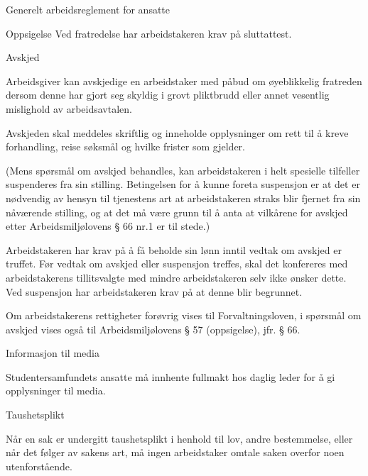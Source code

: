 \begin{lovkapittel}{Generelt arbeidsreglement for ansatte}
\begin{lovparagraf}{Oppsigelse}
        Ved fratredelse har arbeidstakeren krav på sluttattest.

    \end{lovparagraf}

    \begin{lovparagraf}{Avskjed}

        Arbeidsgiver kan avskjedige en arbeidstaker med påbud om øyeblikkelig fratreden dersom denne har gjort seg skyldig
        i grovt pliktbrudd eller annet vesentlig mislighold av arbeidsavtalen.

        Avskjeden skal meddeles skriftlig og inneholde opplysninger om rett til å kreve forhandling, reise søksmål og hvilke
        frister som gjelder.

        (Mens spørsmål om avskjed behandles, kan arbeidstakeren i helt spesielle tilfeller suspenderes fra sin stilling.
        Betingelsen for å kunne foreta suspensjon er at det er nødvendig av hensyn til tjenestens art at arbeidstakeren straks
        blir fjernet fra sin nåværende stilling, og at det må være grunn til å anta at vilkårene for avskjed etter
        Arbeidsmiljølovens § 66 nr.1 er til stede.)

        Arbeidstakeren har krav på å få beholde sin lønn inntil vedtak om avskjed er truffet.
        Før vedtak om avskjed eller suspensjon treffes, skal det konfereres med arbeidstakerens tillitsvalgte med mindre
        arbeidstakeren selv ikke ønsker dette. Ved suspensjon har arbeidstakeren krav på at denne blir begrunnet.

        Om arbeidstakerens rettigheter forøvrig vises til Forvaltningsloven, i spørsmål om avskjed vises også til
        Arbeidsmiljølovens § 57 (oppsigelse), jfr. § 66.

    \end{lovparagraf}

    \begin{lovparagraf}{Informasjon til media}

        Studentersamfundets ansatte må innhente fullmakt hos daglig leder for å gi opplysninger til media.

    \end{lovparagraf}

    \begin{lovparagraf}{Taushetsplikt}

        Når en sak er undergitt taushetsplikt i henhold til lov, andre bestemmelse, eller når det følger av sakens art, må ingen
        arbeidstaker omtale saken overfor noen utenforstående.


\end{lovparagraf}
\end{lovkapittel}
